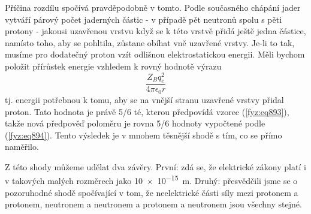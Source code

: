     Příčina rozdílu spočívá pravděpodobně v tomto. Podle současného chápání jader vytváří párový
    počet jaderných částic - v případě  pět neutronů spolu s pěti protony - jakousi
    uzavřenou vrstvu když se k této vrstvě přidá ještě jedna částice, namísto toho, aby se pohltila,
    zůstane obíhat vně uzavřené vrstvy. Je-li to tak, musíme pro dodatečný proton vzít odlišnou
    elektrostatickou energii. Měli bychom položit přírůstek energie  vzhledem k 
    rovný hodnotě výrazu
    \begin{equation*}
      \dfrac{Z_Bq^2_e}{4πϵ_0r}
    \end{equation*}
    tj. energii potřebnou k tomu, aby se na vnější stranu uzavřené vrstvy přidal proton. Tato
    hodnota je právě 5/6 té, kterou předpovídá vzorec (\ref{fyz:eq893}), takže nová předpověď
    poloměru je rovna 5/6 hodnoty vypočtené podle (\ref{fyz:eq894}). Tento výsledek je v mnohem
    těsnější shodě s tím, co se přímo naměřilo.

    Z této shody můžeme udělat dva závěry. První: zdá se, že elektrické zákony platí i v takových
    malých rozměrech jako \SI{10e-15}{\m}. Druhý: přesvědčili jsme se o pozoruhodné shodě
    spočívající v tom, že neelektrické části síly mezi protonem a protonem, neutronem a neutronem a
    protonem a neutronem jsou všechny stejné.
    

